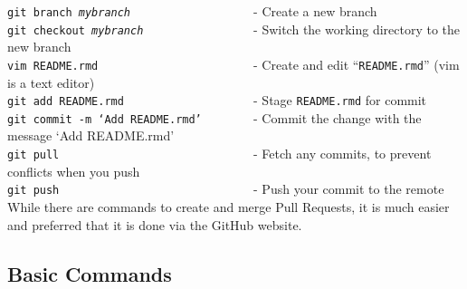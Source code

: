 \documentclass{article}
\begin{document}
\noindent
\texttt{git branch \textit{mybranch}}\verb+                   +- Create a new branch \\
\texttt{git checkout \textit{mybranch}}\verb+                 +- Switch the working directory to the new branch\\
\texttt{vim README.rmd}\verb+                        +- Create and edit ``\texttt{README.rmd}'' (vim is a text editor)\\
\texttt{git add README.rmd}\verb+                    +- Stage \texttt{README.rmd} for commit\\
\texttt{git commit -m `Add README.rmd'}\verb+        +- Commit the change with the message `Add README.rmd'\\
\texttt{git pull}\verb+                              +- Fetch any commits, to prevent conflicts when you push\\
\texttt{git push}\verb+                              +- Push your commit to the remote\\

\noindent
While there are commands to create and merge Pull Requests, it is much easier and preferred that it is done via the GitHub website.

\pagebreak

\subsection{Basic Commands}
\end{document}
